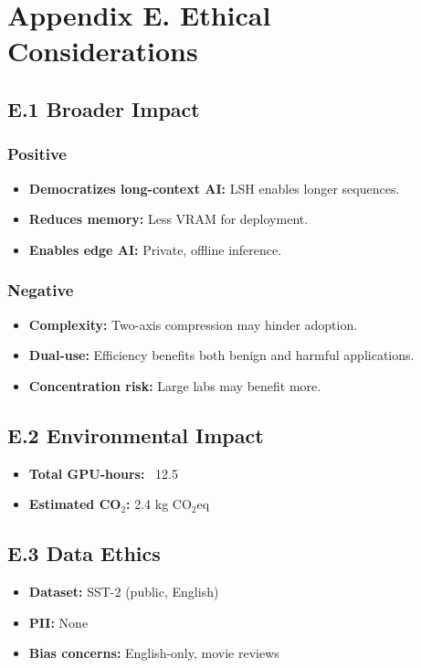 
\section{Appendix E. Ethical Considerations}

\subsection{E.1 Broader Impact}

\subsubsection{Positive}
\begin{itemize}
\item \textbf{Democratizes long-context AI:} LSH enables longer sequences.
\item \textbf{Reduces memory:} Less VRAM for deployment.
\item \textbf{Enables edge AI:} Private, offline inference.

\end{itemize}
\subsubsection{Negative}
\begin{itemize}
\item \textbf{Complexity:} Two-axis compression may hinder adoption.
\item \textbf{Dual-use:} Efficiency benefits both benign and harmful applications.
\item \textbf{Concentration risk:} Large labs may benefit more.

\end{itemize}
\subsection{E.2 Environmental Impact}

\begin{itemize}
\item \textbf{Total GPU-hours:} ~12.5
\item \textbf{Estimated CO$_2$:} 2.4 kg CO$_2$eq

\end{itemize}
\subsection{E.3 Data Ethics}

\begin{itemize}
\item \textbf{Dataset:} SST-2 (public, English)
\item \textbf{PII:} None
\item \textbf{Bias concerns:} English-only, movie reviews

\end{itemize}

